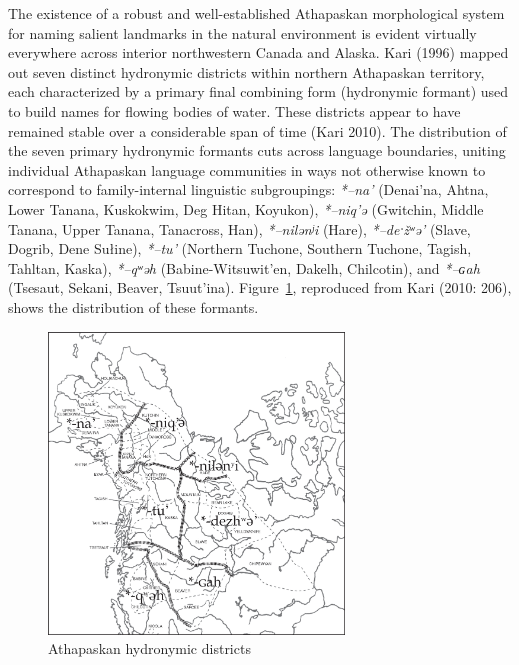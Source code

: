 The existence of a robust and well-established Athapaskan morphological system for naming salient landmarks in the natural environment is evident virtually everywhere across interior northwestern Canada and Alaska. Kari (1996) mapped out seven distinct hydronymic districts within northern Athapaskan territory, each characterized by a primary final combining form (hydronymic formant) used to build names for flowing bodies of water. These districts appear to have remained stable over a considerable span of time (Kari 2010). The distribution of the seven primary hydronymic formants cuts across language boundaries, uniting individual Athapaskan language communities in ways not otherwise known to correspond to family-internal linguistic subgroupings: \textit{*–na’} (Denai’na, Ahtna, Lower Tanana, Kuskokwim, Deg Hitan, Koyukon), \textit{*–niq’ə} (Gwitchin, Middle Tanana, Upper Tanana, Tanacross, Han), \textit{*–nilənʲi} (Hare), \textit{*–deˑžʷə’} (Slave, Dogrib, Dene Sułine), \textit{*–tu’} (Northern Tuchone, Southern Tuchone, Tagish, Tahltan, Kaska), \textit{*–qʷəh} (Babine-Witsuwit’en, Dakelh, Chilcotin), and \textit{*–ɢah} (Tsesaut, Sekani, Beaver, Tsuut’ina). Figure~\ref{vajda-fig1}, reproduced from Kari (2010: 206), shows the distribution of these formants.



\begin{figure}
\centering
\includegraphics[width=0.7\textwidth]{figures/vajda-fig1}
\caption{Athapaskan hydronymic districts}\label{vajda-fig1}
\end{figure}


